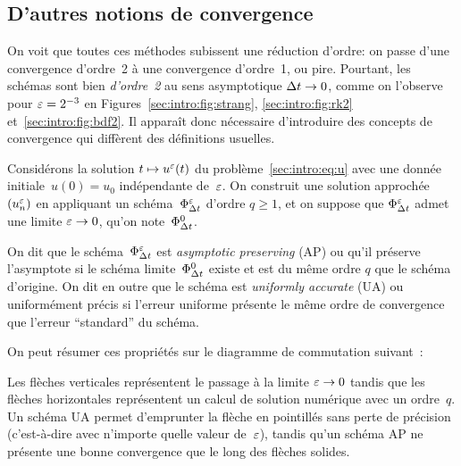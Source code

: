 \subsection*{D'autres notions de convergence}

On voit que toutes ces méthodes subissent une réduction d'ordre: on passe d'une convergence d'ordre~2 à une convergence d'ordre~1, ou pire. Pourtant, les schémas sont bien \textit{d'ordre~2} au sens asymptotique $\Delta t \rightarrow 0$, comme on l'observe pour $\varepsilon = 2^{-3}$ en Figures~\ref{sec:intro:fig:strang}, \ref{sec:intro:fig:rk2} et~\ref{sec:intro:fig:bdf2}. Il apparaît donc nécessaire d'introduire des concepts de convergence qui diffèrent des définitions usuelles. 

\begin{FRdefinition*}
    Considérons la solution $t \mapsto u^{\varepsilon}(t)$ du problème~\eqref{sec:intro:eq:u} avec une donnée initiale~$u(0) = u_0$ indépendante de~$\varepsilon$. On construit une solution approchée~$(u^{\varepsilon} _n)$ en appliquant un schéma~$\Phi^{\varepsilon} _{\Delta t}$ d'ordre $q \geq 1$, et on suppose que $\Phi^{\varepsilon}_{\Delta t}$ admet une limite $\varepsilon \rightarrow 0$, qu'on note~$\Phi^0_{\Delta t}$. 

    On dit que le schéma~$\Phi_{\Delta t}^{\varepsilon}$ est \emph{asymptotic preserving} (AP) ou qu'il préserve l'asymptote si le schéma limite~$\Phi^0_{\Delta t}$ existe et est du même ordre $q$ que le schéma d'origine. On dit en outre que le schéma est \emph{uniformly accurate} (UA) ou uniformément précis si l'erreur uniforme présente le même ordre de convergence que l'erreur \enquote{standard} du schéma. 
\end{FRdefinition*}

On peut résumer ces propriétés sur le diagramme de commutation suivant~:
\begin{center}
\end{center}
Les flèches verticales représentent le passage à la limite $\varepsilon \rightarrow 0$ tandis que les flèches horizontales représentent un calcul de solution numérique avec un ordre~$q$. Un schéma UA permet d'emprunter la flèche en pointillés sans perte de précision (c'est-à-dire avec n'importe quelle valeur de~$\varepsilon$), tandis qu'un schéma AP ne présente une bonne convergence que le long des flèches solides. 


